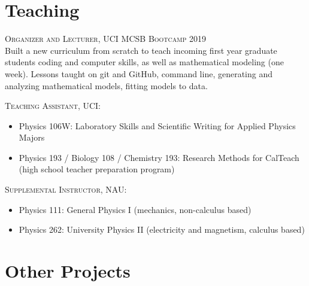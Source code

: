 \documentclass[letterpaper,10pt]{article} %
\begin{document}
\bigskip
\section*{Teaching}
\bigskip

\begin{description}

\item \textsc{Organizer and Lecturer, UCI MCSB Bootcamp 2019}
 \\ Built a new curriculum from scratch to teach incoming first year graduate students coding and computer skills, as well as mathematical modeling (one week). Lessons taught on git and GitHub, command line, generating and analyzing mathematical models, fitting models to data.
 
\item \textsc{Teaching Assistant, UCI:}
\begin{itemize}
\item Physics 106W: Laboratory Skills and Scientific Writing for Applied Physics Majors
\item Physics 193 / Biology 108 / Chemistry 193: Research Methods for CalTeach (high school
teacher preparation program)
\end{itemize}

\item \textsc{Supplemental Instructor, NAU:}
\begin{itemize}
\item Physics 111: General Physics I (mechanics, non-calculus based)
\item Physics 262: University Physics II (electricity and magnetism, calculus based)
\end{itemize}

\end{description}

\bigskip
\section{Other Projects}
\bigskip
\end{document}
